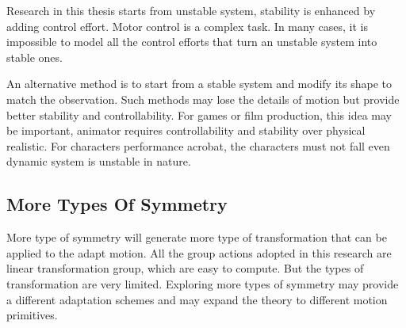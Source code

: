 Research in this thesis starts from unstable system,  stability is enhanced by adding control effort.
Motor control is a complex task. 
In many cases, it is impossible to model all the control efforts that turn an unstable system into stable ones.


An alternative method is to start from a stable system and modify its shape to match the observation.
Such methods may lose the details of motion but provide better stability and controllability. 
For games or film production, this idea may be important, animator requires controllability and stability over physical realistic.
For characters performance acrobat, the characters must not fall even dynamic system is unstable in nature.




\subsection{More Types Of Symmetry}
More type of symmetry will generate more type of transformation that can be applied  to the adapt motion.
All the group actions adopted in this research are linear transformation group, which are easy to compute.
But the types of transformation are very limited.
Exploring more types of symmetry may provide a different adaptation schemes and may expand the theory to different motion primitives.

